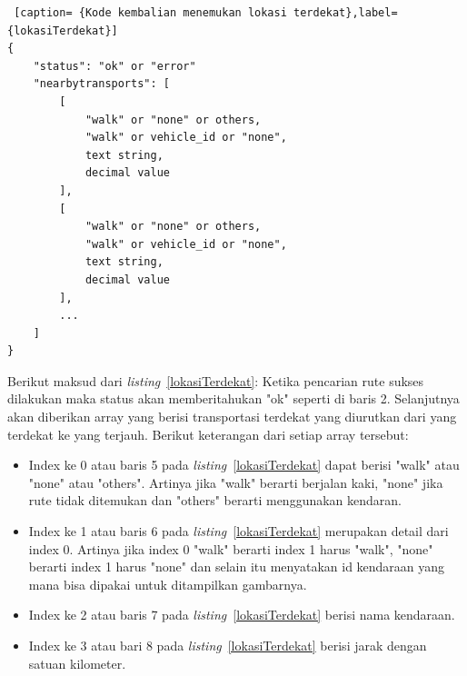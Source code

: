 \begin{lstlisting} [caption= {Kode kembalian menemukan lokasi terdekat},label={lokasiTerdekat}]
{
    "status": "ok" or "error"
    "nearbytransports": [
        [
            "walk" or "none" or others,
            "walk" or vehicle_id or "none",
            text string,
            decimal value
        ],
        [
            "walk" or "none" or others,
            "walk" or vehicle_id or "none",
            text string,
            decimal value
        ],
        ...     
    ]
}\end{lstlisting}
Berikut maksud dari \textit{listing}~\ref{lokasiTerdekat}: \newline
\hspace{0.5cm} Ketika pencarian rute sukses dilakukan maka status akan memberitahukan "ok" seperti di baris 2. Selanjutnya akan diberikan array yang berisi transportasi terdekat yang diurutkan dari yang terdekat ke yang terjauh. Berikut keterangan dari setiap array tersebut: 
\begin{itemize}
	\item Index ke 0 atau baris 5 pada \textit{listing}~\ref{lokasiTerdekat} dapat berisi "walk" atau "none" atau "others". Artinya  jika "walk" berarti berjalan kaki, "none" jika rute tidak ditemukan dan "others" berarti menggunakan kendaran.
	\item Index ke 1 atau baris 6 pada \textit{listing}~\ref{lokasiTerdekat} merupakan detail dari index 0. Artinya jika index 0 "walk" berarti index 1 harus "walk", "none" berarti index 1 harus "none" dan selain itu menyatakan id kendaraan yang mana bisa dipakai untuk ditampilkan gambarnya.
	\item Index ke 2 atau baris 7 pada \textit{listing}~\ref{lokasiTerdekat} berisi nama kendaraan.
	\item Index ke 3 atau bari 8 pada \textit{listing}~\ref{lokasiTerdekat} berisi jarak dengan satuan kilometer.
\end{itemize}